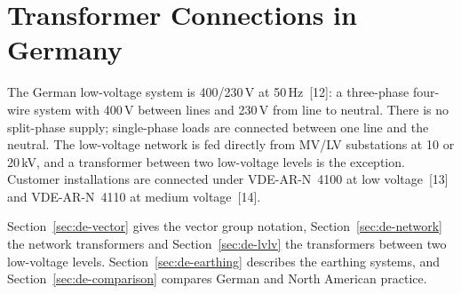 \section{Transformer Connections in Germany}
\label{sec:de}

The German low-voltage system is 400/230\,V at 50\,Hz~[12]: a
three-phase four-wire system with 400\,V between lines and 230\,V from line
to neutral. There is no split-phase supply; single-phase loads are
connected between one line and the neutral. The low-voltage network is fed
directly from MV/LV substations at 10 or 20\,kV, and a transformer between
two low-voltage levels is the exception. Customer installations are
connected under VDE-AR-N~4100 at low voltage~[13] and VDE-AR-N~4110
at medium voltage~[14].

Section~\ref{sec:de-vector} gives the vector group notation,
Section~\ref{sec:de-network} the network transformers and
Section~\ref{sec:de-lvlv} the transformers between two low-voltage levels.
Section~\ref{sec:de-earthing} describes the earthing systems, and
Section~\ref{sec:de-comparison} compares German and North American
practice.






